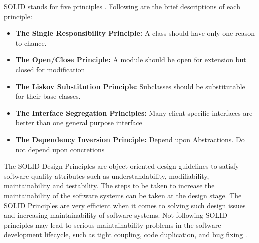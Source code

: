 SOLID stands for five principles \cite{26}. Following are the brief descriptions of each principle:
\begin{itemize}
    \item \textbf{The Single Responsibility Principle:} A class should have only one reason to chance.
    \item \textbf{The Open/Close Principle:} A module should be open for extension but closed for modification
    \item \textbf{The Liskov Substitution Principle:} Subclasses should be substitutable for their base classes.
    \item \textbf{The Interface Segregation Principles:} Many client specific interfaces are better than one general purpose interface 
    \item \textbf{The Dependency Inversion Principle:} Depend upon Abstractions. Do not depend upon concretions
\end{itemize}

The SOLID Design Principles are object-oriented design guidelines to satisfy software quality attributes such as understandability, modifiability, maintainability and testability. The steps to be taken to increase the maintainability of the software systems can be taken at the design stage. The SOLID Principles are very efficient when it comes to solving such design issues and increasing maintainability of software systems.  Not following SOLID principles may lead to serious maintainability problems in the software development lifecycle, such as tight coupling, code duplication, and bug fixing \cite{55}.
